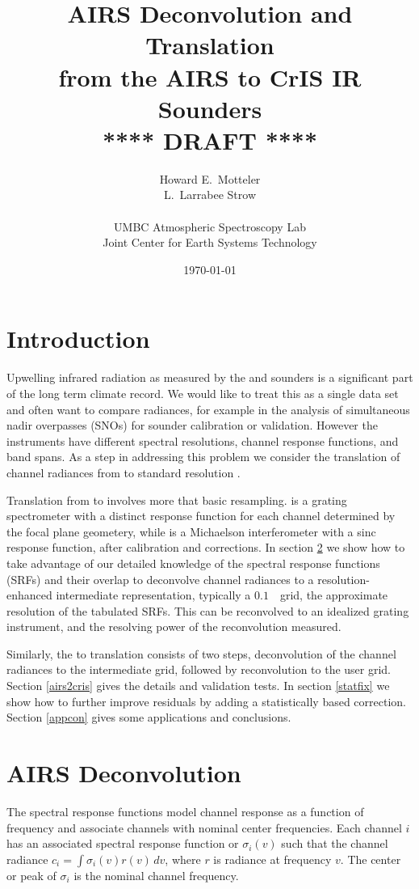 \documentclass[11pt]{article}
\title{AIRS Deconvolution and Translation \\
  from the AIRS to CrIS IR Sounders \\
  \vspace{3mm}
  {****} DRAFT {****}\\
}
\author{Howard E.~Motteler \\
  L.~Larrabee Strow \\
  \\
  UMBC Atmospheric Spectroscopy Lab \\
  Joint Center for Earth Systems Technology \\
}
\date{\today}
\begin{document}
\maketitle

\section{Introduction}

Upwelling infrared radiation as measured by the {\airs} \cite{airs1}
and {\cris} \cite{cris1,cris2} sounders is a significant part of the
long term climate record.  We would like to treat this as a single
data set and often want to compare radiances, for example in the
analysis of simultaneous nadir overpasses (SNOs) for sounder
calibration or validation.  However the instruments have different
spectral resolutions, channel response functions, and band spans.
As a step in addressing this problem we consider the translation of
channel radiances from {\airs} to standard resolution {\cris}.

Translation from {\airs} to {\cris} involves more that basic
resampling.  {\airs} is a grating spectrometer with a distinct
response function for each channel determined by the focal plane
geometery, while {\cris} is a Michaelson interferometer with a sinc
response function, after calibration and corrections.  In section
\ref{decon} we show how to take advantage of our detailed knowledge
of the {\airs} spectral response functions (SRFs) and their overlap
to deconvolve channel radiances to a resolution-enhanced
intermediate representation, typically a $0.1$~\wn\ grid, the
approximate resolution of the tabulated {\airs} SRFs.  This can be
reconvolved to an idealized grating instrument, and the resolving
power of the reconvolution measured.

Similarly, the {\airs} to {\cris} translation consists of two steps,
deconvolution of the {\airs} channel radiances to the intermediate
grid, followed by reconvolution to the {\cris} user grid.  Section
\ref{airs2cris} gives the details and validation tests.  In section
\ref{statfix} we show how to further improve residuals by adding a
statistically based correction.  Section \ref{appcon} gives some
applications and conclusions.

\FloatBarrier
\section{AIRS Deconvolution}
\label{decon}

The {\airs} spectral response functions model channel response as a
function of frequency and associate channels with nominal center
frequencies.  Each {\airs} channel $i$ has an associated spectral
response function or {\srf} $\sigma_i(v)$ such that the channel
radiance $c_i = \int \sigma_i(v)r(v)\,dv$, where $r$ is radiance at
frequency $v$.  The center or peak of $\sigma_i$ is the nominal
channel frequency.
\end{document}
